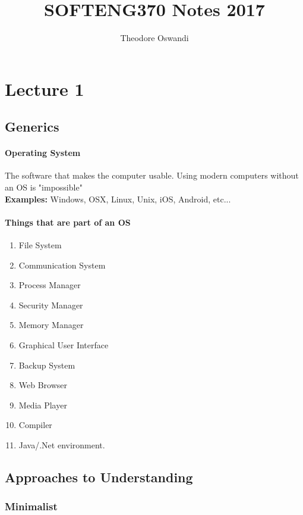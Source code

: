 \documentclass{article}
\title{SOFTENG370 Notes 2017}
\author{Theodore Oswandi}
\newcommand\tab[1][0.5cm]{\hspace*{#1}}
\begin{document}
 \maketitle{} 

\section{Lecture 1}
	\subsection{Generics}
		\paragraph{\tab Operating System} The software that makes the computer usable. Using modern computers without an OS is "impossible"
			\\ \tab \textbf{Examples: }Windows, OSX, Linux, Unix, iOS, Android, etc...

		\paragraph{\tab Things that are part of an OS}
		\begin{enumerate}
			\item File System
			\item Communication System
			\item Process Manager
			\item Security Manager
			\item Memory Manager
			\item Graphical User Interface
			\item Backup System
			\item Web Browser
			\item Media Player
			\item Compiler
			\item Java/.Net environment.
		\end{enumerate}

	\subsection{Approaches to Understanding}
		\subsubsection{Minimalist}
			
\end{document}
